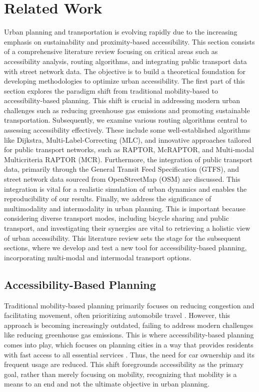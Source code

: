 \clearpage
\section{Related Work}
\label{sec:related_work}

Urban planning and transportation is evolving rapidly due to the increasing emphasis on sustainability and proximity-based accessibility. 
This section consists of a comprehensive literature review focusing on critical areas such as accessibility analysis, routing algorithms, and integrating public transport data with street network data. 
The objective is to build a theoretical foundation for developing methodologies to optimize urban accessibility. 
The first part of this section explores the paradigm shift from traditional mobility-based to accessibility-based planning.
This shift is crucial in addressing modern urban challenges such as reducing greenhouse gas emissions and promoting sustainable transportation. 
Subsequently, we examine various routing algorithms central to assessing accessibility effectively. 
These include some well-established algorithms like Dijkstra, Multi-Label-Correcting (MLC), and innovative approaches tailored for public transport networks, such as RAPTOR, McRAPTOR, and Multi-modal Multicriteria RAPTOR (MCR). 
Furthermore, the integration of public transport data, primarily through the General Transit Feed Specification (GTFS), and street network data sourced from OpenStreetMap (OSM) are discussed. 
This integration is vital for a realistic simulation of urban dynamics and enables the reproducibility of our results. 
Finally, we address the significance of multimodality and intermodality in urban planning.
This is important because considering diverse transport modes, including bicycle sharing and public transport, and investigating their synergies are vital to retrieving a holistic view of urban accessibility.
This literature review sets the stage for the subsequent sections, where we develop and test a new tool for accessibility-based planning, incorporating multi-modal and intermodal transport options.

\subsection{Accessibility-Based Planning}
\label{subsec:accessibility_based_planning}

Traditional mobility-based planning primarily focuses on reducing congestion and facilitating movement, often prioritizing automobile travel .
However, this approach is becoming increasingly outdated, failing to address modern challenges like reducing greenhouse gas emissions.
This is where accessibility-based planning comes into play, which focuses on planning cities in a way that provides residents with fast access to all essential services .
Thus, the need for car ownership and its frequent usage are reduced.
This shift foregrounds accessibility as the primary goal, rather than merely focusing on mobility, recognizing that mobility is a means to an end and not the ultimate objective in urban planning. 

